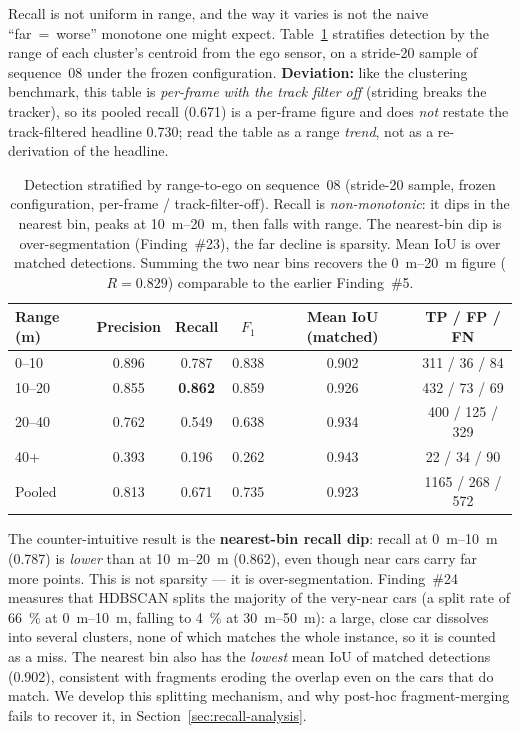 Recall is not uniform in range, and the way it varies is not the naive
``far~=~worse'' monotone one might expect. Table~\ref{tab:distance} stratifies
detection by the range of each cluster's centroid from the ego sensor, on a
stride-20 sample of sequence~08 under the frozen configuration.
\textbf{Deviation:} like the clustering benchmark, this table is
\emph{per-frame with the track filter off} (striding breaks the tracker), so its
pooled recall (\num{0.671}) is a per-frame figure and does \emph{not} restate the
track-filtered headline \num{0.730}; read the table as a range \emph{trend}, not
as a re-derivation of the headline.

\begin{table}[H]
  \centering
  \caption{Detection stratified by range-to-ego on sequence~08 (stride-20 sample,
    frozen configuration, per-frame / track-filter-off). Recall is
    \emph{non-monotonic}: it dips in the nearest bin, peaks at
    \SIrange{10}{20}{\metre}, then falls with range. The nearest-bin dip is
    over-segmentation (Finding~\#23), the far decline is sparsity. Mean IoU is
    over matched detections. Summing the two near bins recovers the
    \SIrange{0}{20}{\metre} figure ($R=\num{0.829}$) comparable to the earlier
    Finding~\#5.}
  \label{tab:distance}
  \begin{tabular}{lccccc}
    \toprule
    Range (m) & Precision & Recall & $F_1$ & Mean IoU (matched) & TP / FP / FN \\
    \midrule
    0--10   & 0.896 & 0.787 & 0.838 & 0.902 & \num{311} / \num{36}  / \num{84}  \\
    10--20  & 0.855 & \textbf{0.862} & 0.859 & 0.926 & \num{432} / \num{73}  / \num{69}  \\
    20--40  & 0.762 & 0.549 & 0.638 & 0.934 & \num{400} / \num{125} / \num{329} \\
    40+     & 0.393 & 0.196 & 0.262 & 0.943 & \num{22}  / \num{34}  / \num{90}  \\
    \midrule
    Pooled  & 0.813 & 0.671 & 0.735 & 0.923 & \num{1165} / \num{268} / \num{572} \\
    \bottomrule
  \end{tabular}
\end{table}

The counter-intuitive result is the \textbf{nearest-bin recall dip}: recall at
\SIrange{0}{10}{\metre} (\num{0.787}) is \emph{lower} than at
\SIrange{10}{20}{\metre} (\num{0.862}), even though near cars carry far more
points. This is not sparsity --- it is over-segmentation. Finding~\#24 measures
that HDBSCAN splits the majority of the very-near cars (a split rate of
\SI{66}{\percent} at \SIrange{0}{10}{\metre}, falling to \SI{4}{\percent} at
\SIrange{30}{50}{\metre}): a large, close car dissolves into several clusters,
none of which matches the whole instance, so it is counted as a miss. The nearest bin
also has the \emph{lowest} mean IoU of matched detections (\num{0.902}),
consistent with fragments eroding the overlap even on the cars that do match. We
develop this splitting mechanism, and why post-hoc fragment-merging fails to
recover it, in Section~\ref{sec:recall-analysis}.

